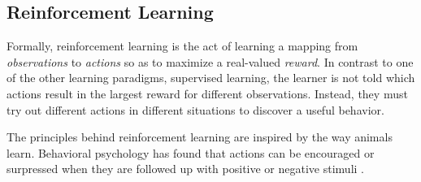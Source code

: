 \subsection{Reinforcement Learning}
Formally, reinforcement learning is the act of learning a mapping from \textit{observations} to \textit{actions} so as to maximize a real-valued \textit{reward}. In contrast to one of the other learning paradigms, supervised learning, the learner is not told which actions result in the largest reward for different observations. Instead, they must try out different actions in different situations to discover a useful behavior. \cite{bible}

The principles behind reinforcement learning are inspired by the way animals learn. Behavioral psychology has found that actions can be encouraged or surpressed when they are followed up with positive or negative stimuli \cite{thorndike}.





